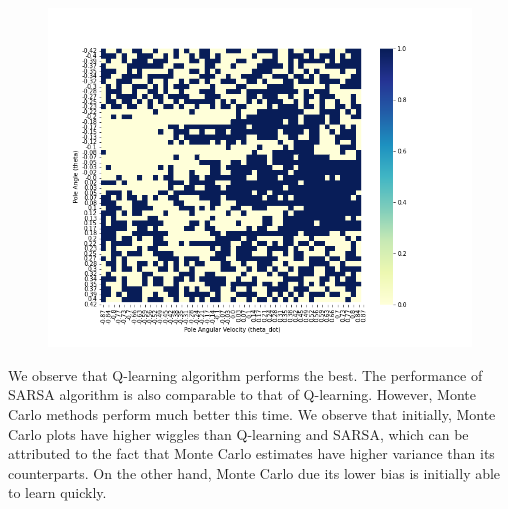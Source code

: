 \documentclass{article}
\begin{document}
\begin{figure}[H]
\begin{minipage}{.33\textwidth}
          \label{fig:test2}
        \end{minipage}
        \begin{minipage}{.33\textwidth}
        \nonumber
            \centering
            \includegraphics[width=\linewidth]{CartPole_qlearn_policy.png}
            \label{fig:test2}
          \end{minipage}
        \end{figure}

\noindent %
We observe that Q-learning algorithm performs the best. The performance of SARSA algorithm is also comparable to that of Q-learning.
However, Monte Carlo methods perform much better this time. We observe that initially, Monte Carlo plots have higher wiggles than
Q-learning and SARSA, which can be attributed to the fact that Monte Carlo estimates have higher variance than its counterparts. 
On the other hand, Monte Carlo due its lower bias is initially able to learn quickly.
\end{document}
